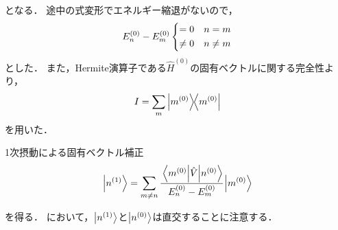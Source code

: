 \documentclass{report}
\begin{document}
  となる．
  途中の式変形でエネルギー縮退がないので，
  \begin{align}
    E_n^{(0)} - E_m^{(0)} 
    \begin{dcases}
      = 0 & n = m \label{no-degeneracy} \\ 
      \neq 0 & n \neq m
    \end{dcases}
  \end{align}
  とした．
  また，Hermite演算子である$\hat{H}^{(0)}$の固有ベクトルに関する完全性より，
  \begin{align}
    I = \sum_{m}\ketbra{m^{(0)}}{m^{(0)}}\label{completeness}
  \end{align}
  を用いた．
  \begin{itembox}[l]{1次摂動による固有ベクトル補正}
    \begin{align}
      \ket{n^{(1)}} = \sum_{m\neq n}\cfrac{\mel**{m^{(0)}}{\hat{V}}{n^{(0)}}}{E_n^{(0)} - E_m^{(0)}}\ket{m^{(0)}}\label{1st-order-eigenvector}
    \end{align}
  \end{itembox}
  を得る．
  において，$\ket{n^{(1)}}$と$\ket{n^{(0)}}$は直交することに注意する．
\end{document}
